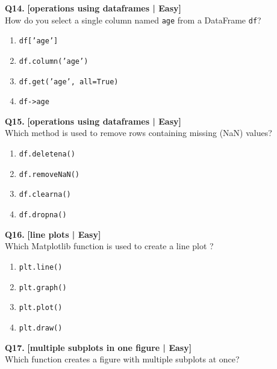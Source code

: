 \noindent\textbf{Q14.} \hfill {\small\color{LPUOrange}\textbf{[operations using dataframes | Easy]}}\\[2pt]
How do you select a single column named \texttt{age} from a DataFrame \texttt{df}?

\begin{enumerate}[label=(\alph*),topsep=2pt,itemsep=1pt,partopsep=0pt,parsep=0pt]
    \item \relax \texttt{df['age']}
    \item \relax \texttt{df.column('age')}
    \item \relax \texttt{df.get('age', all=True)}
    \item \relax \texttt{df->age}
\end{enumerate}
\vspace{2mm}

\noindent\textbf{Q15.} \hfill {\small\color{LPUOrange}\textbf{[operations using dataframes | Easy]}}\\[2pt]
Which method is used to remove rows containing missing (NaN) values?

\begin{enumerate}[label=(\alph*),topsep=2pt,itemsep=1pt,partopsep=0pt,parsep=0pt]
    \item \relax \texttt{df.deletena()}
    \item \relax \texttt{df.removeNaN()}
    \item \relax \texttt{df.clearna()}
    \item \relax \texttt{df.dropna()}
\end{enumerate}
\vspace{2mm}

\noindent\textbf{Q16.} \hfill {\small\color{LPUOrange}\textbf{[line plots | Easy]}}\\[2pt]
Which Matplotlib function is used to create a line plot ?

\begin{enumerate}[label=(\alph*),topsep=2pt,itemsep=1pt,partopsep=0pt,parsep=0pt]
    \item \relax \texttt{plt.line()}
    \item \relax \texttt{plt.graph()}
    \item \relax \texttt{plt.plot()}
    \item \relax \texttt{plt.draw()}
\end{enumerate}
\vspace{2mm}

\noindent\textbf{Q17.} \hfill {\small\color{LPUOrange}\textbf{[multiple subplots in one figure | Easy]}}\\[2pt]
Which function creates a figure with multiple subplots at once?


